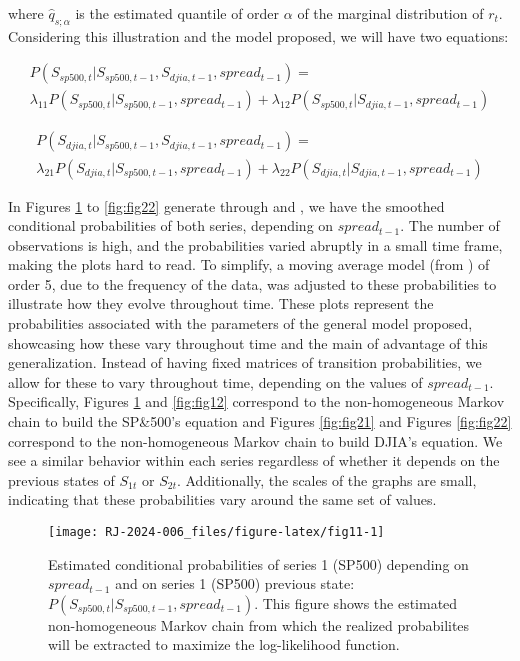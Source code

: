 where \(\widehat{q}_{s;\alpha}\) is the estimated quantile of order \(\alpha\) of the marginal distribution of \(r_t\). Considering this illustration and the model proposed, we will have two equations:

\begin{multline}
P(S_{sp500,t} | S_{sp500, t-1}, S_{djia, t-1}, spread_{t-1}) = \\ \lambda_{11} P(S_{sp500,t} | S_{sp500, t-1}, spread_{t-1}) + \lambda_{12} P(S_{sp500,t} | S_{djia, t-1}, spread_{t-1}) \label{eq:eq13}
\end{multline}

\begin{multline}
P(S_{djia,t} | S_{sp500, t-1}, S_{djia, t-1}, spread_{t-1}) = \\ \lambda_{21} P(S_{djia,t} | S_{sp500, t-1}, spread_{t-1}) + \lambda_{22} P(S_{djia,t} | S_{djia, t-1}, spread_{t-1}) \label{eq:eq14}
\end{multline}

In Figures \ref{fig:fig11} to \ref{fig:fig22} generate through  \citep{ggplot2} and  \citep{gridextra}, we have the smoothed conditional probabilities of both series, depending on \(spread_{t-1}\). The number of observations is high, and the probabilities varied abruptly in a small time frame, making the plots hard to read. To simplify, a moving average model (from  \citep{pracma}) of order 5, due to the frequency of the data, was adjusted to these probabilities to illustrate how they evolve throughout time. These plots represent the probabilities associated with the parameters of the general model proposed, showcasing how these vary throughout time and the main of advantage of this generalization. Instead of having fixed matrices of transition probabilities, we allow for these to vary throughout time, depending on the values of \(spread_{t-1}\). Specifically, Figures \ref{fig:fig11} and \ref{fig:fig12} correspond to the non-homogeneous Markov chain to build the SP\&500's equation and Figures \ref{fig:fig21} and Figures \ref{fig:fig22} correspond to the non-homogeneous Markov chain to build DJIA's equation. We see a similar behavior within each series regardless of whether it depends on the previous states of \(S_{1t}\) or \(S_{2t}\). Additionally, the scales of the graphs are small, indicating that these probabilities vary around the same set of values.

\begin{figure}

{\centering \texttt{[image: RJ-2024-006\_files/figure-latex/fig11-1]} 

}

\caption{Estimated conditional probabilities of series 1 (SP500) depending on $spread_{t-1}$ and on series 1 (SP500) previous state: $P(S_{sp500,t} | S_{sp500, t-1}, spread_{t-1})$. This figure shows the estimated non-homogeneous Markov chain from which the realized probabilites will be extracted to maximize the log-likelihood function.}\label{fig:fig11}
\end{figure}


